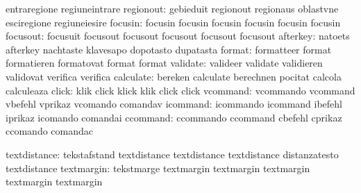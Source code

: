                            entraregione              regiuneintrare
                regionout: gebieduit                 regionout
                           regionaus                 oblastvne
                           esciregione               regiuneiesire
                  focusin: focusin                   focusin
                           focusin                   focusin
                           focusin                   focusin
                 focusout: focusuit                  focusout
                           focusout                  focusout
                           focusout                  focusout
                 afterkey: natoets                   afterkey
                           nachtaste                 klavesapo
                           dopotasto                 dupatasta
                   format: formatteer                format
                           formatieren               formatovat
                           format                    format %
                 validate: valideer                  validate
                           validieren                validovat
                           verifica                  verifica
                calculate: bereken                   calculate
                           berechnen                 pocitat
                           calcola                   calculeaza
                    click: klik                      click
                           klick                     klik
                           click                     click
                 vcommand: vcommando                 vcommand
                           vbefehl                   vprikaz
                           vcomando                  comandav
                 icommand: icommando                 icommand
                           ibefehl                   iprikaz
                           icomando                  comandai
                 ccommand: ccommando                 ccommand
                           cbefehl                   cprikaz
                           ccomando                  comandac

             textdistance: tekstafstand              textdistance
                           textdistance              textdistance
                           distanzatesto             textdistance %
               textmargin: tekstmarge                textmargin
                           textmargin                textmargin
                           textmargin                textmargin   %

